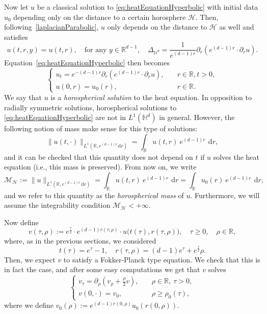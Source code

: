 \documentclass[12pt,longbibliography]{article}
\def\R{\mathbb{R}}
\def\d{\,\mathrm{d}}
\def\R{\mathbb{R}}
\def\d{\,\mathrm{d}}
\def\H{\mathbb{H}}
\theoremstyle{definition}
\theoremstyle{remark}
\theoremstyle{example}
\begin{document}
Now let $u$ be a classical solution to \eqref{eq:heatEquationHyperbolic} with initial data $u_0$ depending only on the distance to a certain horosphere $\mathcal{H}$. Then, following~\eqref{laplacianParabolic}, $u$ only depends on the distance to $\mathcal{H}$ as well and satisfies 
\[
u(t,r,y)=u(t,r), \quad \text{for any } y \in \mathbb{R}^{d-1},\quad \Delta_{\H^d} = \frac{1}{e^{(d-1)r}} \partial_r \left(e^{(d-1)r}\cdot \partial_r u\right).
\]
Equation~\eqref{eq:heatEquationHyperbolic} then becomes
\begin{equation}\label{eq:heatEquation_horospheric_solutions}
	\begin{cases}
		u_t = e^{-(d-1)r}\partial_r\left(e^{(d-1)r}\cdot \partial_r u\right), \quad &r\in\R, t>0,\\
		u(0,r)=u_0(r), & r\in\R.
	\end{cases}
\end{equation}
We say that $u$ is a \textit{horospherical solution} to the heat equation. In opposition to radially symmetric solutions, horospherical solutions to \eqref{eq:heatEquationHyperbolic} are not in $L^{1} (\mathbb{H}^{d})$ in general. However, the following notion of mass make sense for this type of solutions:
\[
\|u(t,\cdot)\|_{L^1(\mathbb{R}, e^{(d-1)r} \d r)} = \int_{\R} u(t,r)\ e^{(d-1)r}\ \d r,
\]
and it can be checked that this quantity does not depend on $t$ if $u$ solves the heat equation (i.e., this mass is preserved). From now on, we write
\[
\mathcal{M}_{\mathcal{H}} := \|u\|_{L^1(\mathbb{R}, e^{(d-1)r} \d r)} = \int_{\R} u(t,r)\ e^{(d-1)r}\ \d r = \int_{\R} u_0 (r)\ e^{(d-1)r}\ \d r,
\]
and we refer to this quantity as the \textit{horospherical mass} of $u$. Furthermore, we will assume the integrability condition $\mathcal{M}_{\mathcal{H}}<+\infty$.

Now define 
\begin{equation}\label{definv}
v(\tau, \rho):=e^\frac{\tau}{2}\cdot e^{(d-1)r (\tau, \rho)} \cdot u\big(t(\tau), r(\tau,\rho)\big), \quad \tau \geq 0, \quad \rho \in \mathbb{R},
\end{equation}
where, as in the previous sections, we considered
\[
t(\tau)=e^\tau-1,\quad r(\tau,\rho)= (d-1)e^\tau  + e^\frac{\tau}{2}\rho.
\]
Then, we expect $v$ to satisfy a Fokker-Planck type equation. We check that this is in fact the case, and after some easy computations we get that $v$ solves
\begin{equation}\label{fokkerPlanckParabolic}
	\begin{cases}
	v_\tau = \partial_\rho \left( v_\rho + \frac{\rho}{2} v \right), \quad &\rho \in \mathbb{R},\ \tau>0,\\
		v(0,\cdot) = v_0, &\rho\geq \rho_0(\tau),
	\end{cases}
\end{equation}
where we define $v_0 (\rho) := e^{(d-1)r(0,\rho)}u_0 (r(0, \rho))$.
\end{document}
